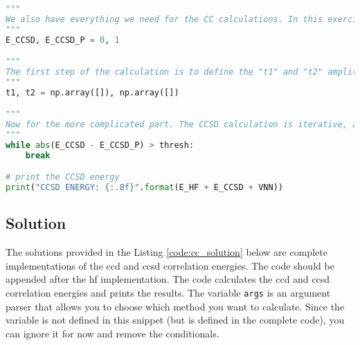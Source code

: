 \raggedbottom\begin{lstlisting}[language=Python, caption={\acrshort{ccsd} exercise code.}, label=code:cc_exercise]
"""
We also have everything we need for the CC calculations. In this exercise, we will calculate the CCSD energy. Since the calculation will be iterative, I define here the CCSD energy as zero, the "E_CCSD_P" variable will be used to monitor convergence.
"""
E_CCSD, E_CCSD_P = 0, 1

"""
The first step of the calculation is to define the "t1" and "t2" amplitudes. These arrays can be initialized as zero arrays with the appropriate dimensions. I will leave this task to you.
"""
t1, t2 = np.array([]), np.array([])

"""
Now for the more complicated part. The CCSD calculation is iterative, and the convergence criterion is set by the "thresh" variable. The while loop should be filled with the appropriate calculations. The calculation of the "t1" and "t2" amplitudes is the most challenging part of the CCSD calculation. After convergence, the "E_CCSD" variable should store the final CCSD energy.
"""
while abs(E_CCSD - E_CCSD_P) > thresh:
    break

# print the CCSD energy
print("CCSD ENERGY: {:.8f}".format(E_HF + E_CCSD + VNN))
\end{lstlisting}

\subsection{Solution}

The solutions provided in the Listing \ref{code:cc_solution} below are complete implementations of the \acrshort{ccd} and \acrshort{ccsd} correlation energies. The code should be appended after the \acrshort{hf} implementation. The code calculates the \acrshort{ccd} and \acrshort{ccsd} correlation energies and prints the results. The variable \texttt{\lstinline!args!} is an argument parser that allows you to choose which method you want to calculate. Since the variable is not defined in this snippet (but is defined in the complete code), you can ignore it for now and remove the conditionals.

